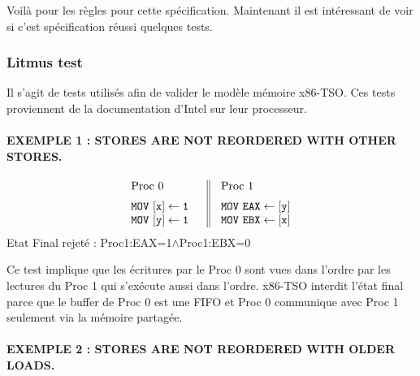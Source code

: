 \documentclass[12pt,a4paper]{article}
\begin{document}
Voilà pour les règles pour cette spécification. Maintenant il est intéressant de voir si c'est spécification réussi quelques tests.

\subsubsection*{Litmus test}

Il s'agit de tests utilisés afin de valider le modèle mémoire x86-TSO. Ces tests proviennent de la documentation d'Intel sur leur processeur.

\paragraph{EXEMPLE 1 : STORES ARE NOT REORDERED WITH OTHER STORES.}

\begin{center}
\[
\begin{array}{c||c}
  \begin{array}{l}
  	\vspace{0.2cm}
    \text{Proc 0} \hspace{1.0cm}\\
    \mathtt{MOV \text{ } [x] \leftarrow 1} \\
    \mathtt{MOV \text{ } [y] \leftarrow 1} \\
  \end{array}&
  \begin{array}{l}
  \vspace{0.2cm}
   \text{Proc 1} \\
    \mathtt{MOV \text{ } EAX \leftarrow [y]} \\
    \mathtt{MOV \text{ } EBX \leftarrow [x]} \\
  \end{array}
\end{array}
\]
Etat Final rejeté : Proc1:EAX=1$\land$Proc1:EBX=0
\end{center}

Ce test implique que les écritures par le Proc 0 sont vues dans l'ordre par les lectures du Proc 1 qui s'exécute aussi dans l'ordre. x86-TSO interdit l'état final parce que le buffer de Proc 0 est une FIFO et Proc 0 communique avec Proc 1 seulement via  la mémoire partagée.

\paragraph{EXEMPLE 2 : STORES ARE NOT REORDERED WITH OLDER LOADS.}
\end{document}
